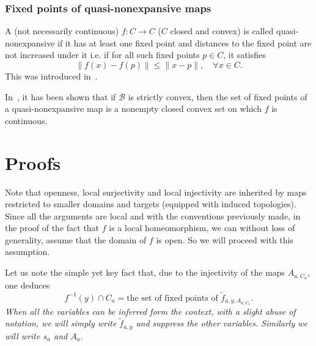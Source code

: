 \documentclass[a4, 12pt,leqno]{amsart}
\theoremstyle{plain}
\theoremstyle{definition}
\theoremstyle{remark}
\numberwithin{equation}{section}
\newcommand{\B}{\mathcal{B}}
\begin{document}
\subsubsection{Fixed points of quasi-nonexpansive maps}\label{subsubsec:fp-qn}
A (not necessarily continuous) $f:C \to C$ ($C$ closed and convex) is called quasi-nonexpansive if it has at least one fixed point and distances to the fixed point are not increased under it i.e. if for all such fixed points $p \in C$, it satisfies 
\[
\|f(x) - f(p)\|\le \|x-p\|, \quad \forall x\in C.
\]
This was introduced in~\cite{DM}. 
\par In~\cite{Dotson}, it has been shown that if $\B$ is strictly convex, then the set of fixed points of a quasi-nonexpansive map is a nonempty closed convex set on which $f$ is continuous. 
\section{Proofs}\label{sec:Proofs}
\par Note that openness, local surjectivity and local injectivity are inherited by maps restricted to smaller domains and targets (equipped with induced topologies). Since all the arguments are local and with the conventions previously made, in the proof of the fact that $f$ is a local homeomorphism, we can without loss of generality, assume that the domain of $f$ is open. So we will proceed with this assumption. 
\par Let us note the simple yet key fact that, due to the injectivity of the maps $A_{a,C_a}$, one deduces
\[
f^{-1}(y) \cap C_a = \text{the set of fixed points of $\tilde{f}_{a,y,A_{a,C_a}}$}.
\]
\emph{When all the variables can be inferred form the context, with a slight abuse of notation, we will simply write $\tilde{f}_{a,y}$ and suppress the other variables. Similarly we will write $s_a$ and $A_a$}.
\end{document}
